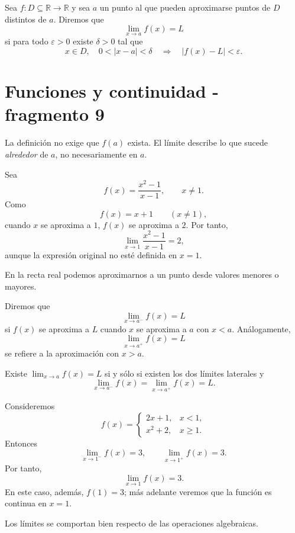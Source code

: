 \begin{definition}
Sea $f:D\subseteq\mathbb{R}\to\mathbb{R}$ y sea $a$ un punto al que pueden aproximarse puntos de $D$ distintos de $a$. Diremos que
\[
\lim_{x\to a}f(x)=L
\]
si para todo $\varepsilon>0$ existe $\delta>0$ tal que
\[
x\in D,\quad 0<|x-a|<\delta
\quad\Longrightarrow\quad
|f(x)-L|<\varepsilon.
\]
\end{definition}


\section{Funciones y continuidad - fragmento 9}
La definición no exige que $f(a)$ exista. El límite describe lo que sucede \emph{alrededor} de $a$, no necesariamente en $a$.

\begin{example}
Sea
\[
f(x)=\frac{x^2-1}{x-1},\qquad x\neq1.
\]
Como
\[
f(x)=x+1\qquad (x\neq1),
\]
cuando $x$ se aproxima a $1$, $f(x)$ se aproxima a $2$. Por tanto,
\[
\lim_{x\to1}\frac{x^2-1}{x-1}=2,
\]
aunque la expresión original no esté definida en $x=1$.
\end{example}

En la recta real podemos aproximarnos a un punto desde valores menores o mayores.

\begin{definition}
Diremos que
\[
\lim_{x\to a^-}f(x)=L
\]
si $f(x)$ se aproxima a $L$ cuando $x$ se aproxima a $a$ con $x<a$. Análogamente,
\[
\lim_{x\to a^+}f(x)=L
\]
se refiere a la aproximación con $x>a$.
\end{definition}

\begin{theorem}
Existe $\displaystyle\lim_{x\to a}f(x)=L$ si y sólo si existen los dos límites laterales y
\[
\lim_{x\to a^-}f(x)=\lim_{x\to a^+}f(x)=L.
\]
\end{theorem}

\begin{example}
Consideremos
\[
f(x)=
\begin{cases}
2x+1, & x<1,\\
x^2+2, & x\geq1.
\end{cases}
\]
Entonces
\[
\lim_{x\to1^-}f(x)=3,
\qquad
\lim_{x\to1^+}f(x)=3.
\]
Por tanto,
\[
\lim_{x\to1}f(x)=3.
\]
En este caso, además, $f(1)=3$; más adelante veremos que la función es continua en $x=1$.
\end{example}

Los límites se comportan bien respecto de las operaciones algebraicas.

